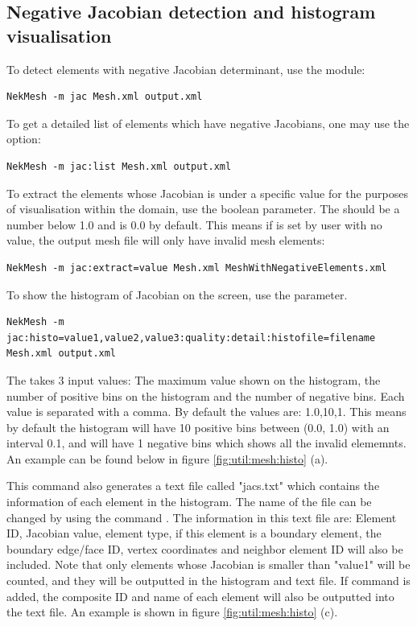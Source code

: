 \subsection{Negative Jacobian detection and histogram visualisation}

To detect elements with negative Jacobian determinant, use the 
module:
%
\begin{lstlisting}[style=BashInputStyle]
NekMesh -m jac Mesh.xml output.xml
\end{lstlisting}
%
To get a detailed list of elements which have negative Jacobians, one may use
the  option:
%
\begin{lstlisting}[style=BashInputStyle]
NekMesh -m jac:list Mesh.xml output.xml
\end{lstlisting}
%
To extract the elements whose Jacobian is under a specific value for the purposes of visualisation within the domain,
use the  boolean parameter. The  should be a number below 1.0 and is 0.0 by default. This means if  is set by user with no value, the output mesh file will only have invalid mesh elements:
%
\begin{lstlisting}[style=BashInputStyle]
NekMesh -m jac:extract=value Mesh.xml MeshWithNegativeElements.xml
\end{lstlisting}

To show the histogram of Jacobian on the screen, use the  parameter.

\begin{lstlisting}[style=BashInputStyle]
NekMesh -m jac:histo=value1,value2,value3:quality:detail:histofile=filename Mesh.xml output.xml
\end{lstlisting}

The  takes 3 input values: The maximum value shown on the histogram, the number of positive bins on the histogram and the number of negative bins. Each value is separated with a comma. By default the values are: 1.0,10,1. This means by default the histogram will have 10 positive bins between (0.0, 1.0) with an interval 0.1, and will have 1 negative bins which shows all the invalid elememnts. An example can be found below in figure \ref{fig:util:mesh:histo} (a).

This command  also generates a text file called "jacs.txt" which contains the information of each element in the histogram. The name of the file can be changed by using the command . The information in this text file are: Element ID, Jacobian value, element type, if this element is a boundary element, the boundary edge/face ID, vertex coordinates and neighbor element ID will also be included. Note that only elements whose Jacobian is smaller than "value1" will be counted, and they will be outputted in the histogram and text file. If command  is added, the composite ID and name of each element will also be outputted into the text file. An example is shown in figure \ref{fig:util:mesh:histo} (c). 

